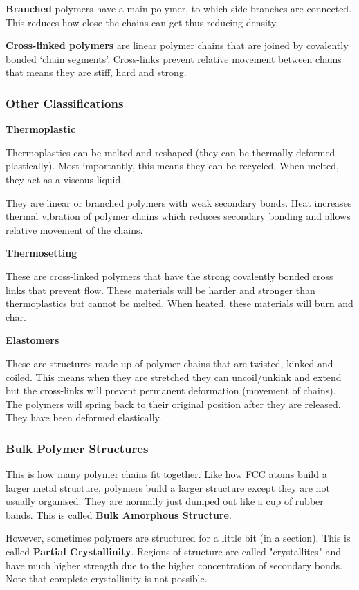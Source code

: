 \documentclass[12pt]{article}
\begin{document}
\textbf{Branched}
polymers have a main polymer, to which side branches are connected.
This reduces how close the chains can get thus reducing density.

\textbf{Cross-linked polymers}
are linear polymer chains that are joined by covalently bonded `chain segments'.
Cross-links prevent relative movement between chains that means they are stiff, hard and strong. 

\subsubsection{Other Classifications}
\textbf{Thermoplastic}

Thermoplastics can be melted and reshaped (they can be thermally deformed plastically).
Most importantly, this means they can be recycled.
When melted, they act as a viscous liquid.

They are linear or branched polymers with weak secondary bonds.
Heat increases thermal vibration of polymer chains which reduces secondary bonding and allows relative movement of the chains.

\textbf{Thermosetting}

These are cross-linked polymers that have the strong covalently bonded cross links that prevent flow. 
These materials will be harder and stronger than thermoplastics but cannot be melted.
When heated, these materials will burn and char. 

\textbf{Elastomers} 

These are structures made up of polymer chains that are twisted, kinked and coiled.
This means when they are stretched they can uncoil/unkink and extend but the cross-links will prevent permanent deformation (movement of chains).
The polymers will spring back to their original position after they are released. 
They have been deformed elastically.

\subsubsection{Bulk Polymer Structures}
This is how many polymer chains fit together. 
Like how FCC atoms build a larger metal structure, polymers build a larger structure except they are not usually organised.
They are normally just dumped out like a cup of rubber bands. 
This is called \textbf{Bulk Amorphous Structure}.

However, sometimes polymers are structured for a little bit (in a section).
This is called \textbf{Partial Crystallinity}.
Regions of structure are called "crystallites" and have much higher strength due to the higher concentration of secondary bonds. 
Note that complete crystallinity is not possible.
\end{document}

